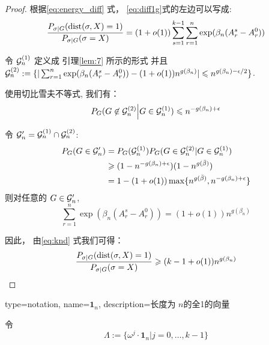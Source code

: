 \begin{proof}
根据\eqref{eq:energy_diff} 式，
\eqref{eq:diff1g}式的左边可以写成:
\begin{equation}\label{eq:knd}
	\frac{P_{\sigma|G}(\operatorname{dist}(\sigma, X)=1)}
{P_{\sigma|G}(\sigma=X)}= (1+o(1))\sum_{s=1}^{k-1}\sum_{r=1}^n \exp(\beta_n (A_r^s - A_r^0))
\end{equation}

令 $\mathcal{G}^{(1)}_n$ 定义成 引理\ref{lem:7} 所示的形式
并且 $\cG^{(2)}_n: = \{|\sum_{r=1}^n \exp(\beta_n (A_r^s - A_r^0)) -\linebreak (1+o(1))n^{g(\beta_n)}  | \leq n^{g(\beta_n) - \epsilon / 2} \}$.

使用切比雪夫不等式, 我们有：
\begin{equation*}
  P_G(G \not\in \mathcal{G}^{(2)}_n \Big\vert  G \in \mathcal{G}^{(1)}_n) \leqslant n^{- g(\beta_n) + \epsilon}
  \end{equation*}
  
  令 $\mathcal{G}'_n = \mathcal{G}^{(1)}_n \cap \mathcal{G}^{(2)}_n$:
  \begin{align*}
  P_G(G \in \mathcal{G}'_n) &= P_G(\mathcal{G}^{(1)}_n) P_G(G \in \mathcal{G}_n^{(2)} | G \in \mathcal{G}_n^{(1)}) \\
  & \geqslant (1-n^{ - g(\beta_n) + \epsilon})(1-n^{g(\bar{\beta})}) \\
  &= 1-(1+o(1))\max\{n^{g(\bar{\beta})}, n^{- g(\beta_n) + \epsilon} \}
  \end{align*}
  则对任意的 $G\in\mathcal{G}'_n$,
  \begin{equation*}
  \sum_{r=1}^n \exp(\beta_n (A_r^s - A_r^0)) = (1+o(1)) n^{g(\beta_n)}
  \end{equation*}
  
  因此，
  由\eqref{eq:knd} 式我们可得：
  \begin{equation*}
    \frac{P_{\sigma|G}(\operatorname{dist}(\sigma, X)=1)}
  {P_{\sigma|G}(\sigma=X)} \geqslant (k-1+o(1)) n^{g(\beta_n)}
  \end{equation*}
\end{proof}

{
  type=notation,
  name={\ensuremath{\mathbf{1}_n}},
  description={长度为 $n$的全1的向量}
}


令
\begin{equation}\label{eq:Big_Lambda}
  \Lambda := \{ \omega^j  \cdot \mathbf{1}_n | j=0, \dots,k-1\}   
\end{equation}


